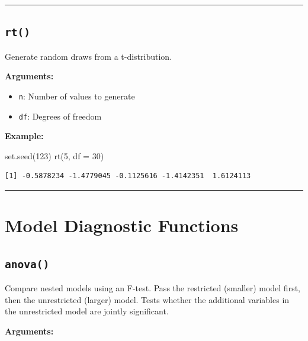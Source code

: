 \documentclass[
  letterpaper,
  DIV=11,
  numbers=noendperiod]{scrreprt}
\newenvironment{Shaded}{\begin{snugshade}}{\end{snugshade}}
\newcommand{\AttributeTok}[1]{\textcolor[rgb]{0.40,0.45,0.13}{#1}}
\newcommand{\DecValTok}[1]{\textcolor[rgb]{0.68,0.00,0.00}{#1}}
\newcommand{\FunctionTok}[1]{\textcolor[rgb]{0.28,0.35,0.67}{#1}}
\newcommand{\NormalTok}[1]{\textcolor[rgb]{0.00,0.23,0.31}{#1}}
\providecommand{\tightlist}{%
  \setlength{\itemsep}{0pt}\setlength{\parskip}{0pt}}
\begin{document}
\begin{center}\rule{0.5\linewidth}{0.5pt}\end{center}

\subsection{\texorpdfstring{\texttt{rt()}}{rt()}}\label{rt}

Generate random draws from a t-distribution.

\textbf{Arguments:}

\begin{itemize}
\tightlist
\item
  \texttt{n}: Number of values to generate
\item
  \texttt{df}: Degrees of freedom
\end{itemize}

\textbf{Example:}

\begin{Shaded}
\begin{Highlighting}[]
\FunctionTok{set.seed}\NormalTok{(}\DecValTok{123}\NormalTok{)}
\FunctionTok{rt}\NormalTok{(}\DecValTok{5}\NormalTok{, }\AttributeTok{df =} \DecValTok{30}\NormalTok{)}
\end{Highlighting}
\end{Shaded}

\begin{verbatim}
[1] -0.5878234 -1.4779045 -0.1125616 -1.4142351  1.6124113
\end{verbatim}

\begin{center}\rule{0.5\linewidth}{0.5pt}\end{center}

\section{Model Diagnostic Functions}\label{model-diagnostic-functions}

\subsection{\texorpdfstring{\texttt{anova()}}{anova()}}\label{anova}

Compare nested models using an F-test. Pass the restricted (smaller)
model first, then the unrestricted (larger) model. Tests whether the
additional variables in the unrestricted model are jointly significant.

\textbf{Arguments:}
\end{document}
